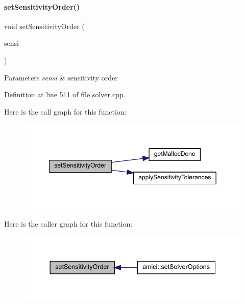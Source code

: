\paragraph{\texorpdfstring{set\+Sensitivity\+Order()}{setSensitivityOrder()}}
{\footnotesize\ttfamily void set\+Sensitivity\+Order (\begin{DoxyParamCaption}\item[{\mbox{\hyperlink{namespaceamici_aaa03ec2f8c4d5323b98d71134a462fda}{Sensitivity\+Order}}}]{sensi }\end{DoxyParamCaption})}


\begin{DoxyParams}{Parameters}
{\em sensi} & sensitivity order \\
\hline
\end{DoxyParams}


Definition at line 511 of file solver.\+cpp.

Here is the call graph for this function\+:
\nopagebreak
\begin{figure}[H]
\begin{center}
\leavevmode
\includegraphics[width=349pt]{classamici_1_1_solver_a26129f061fdf7869be2d3e4aa22532b6_cgraph}
\end{center}
\end{figure}
Here is the caller graph for this function\+:
\nopagebreak
\begin{figure}[H]
\begin{center}
\leavevmode
\includegraphics[width=337pt]{classamici_1_1_solver_a26129f061fdf7869be2d3e4aa22532b6_icgraph}
\end{center}
\end{figure}
\mbox{\label{classamici_1_1_solver_a54fe1b062315ed19b2dbf88206415e06}} 

